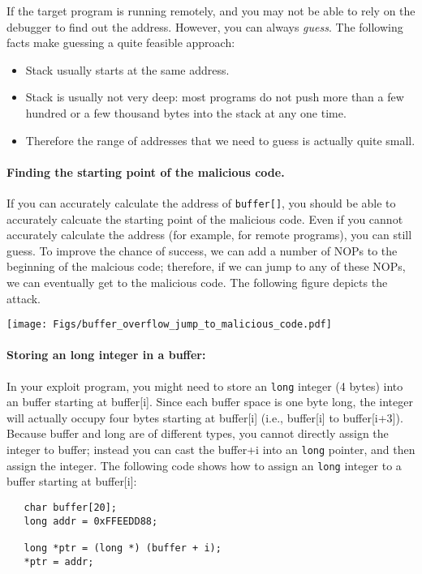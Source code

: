 If the target program is running remotely, and you may not be able to
rely on the debugger to find out the address. However, you can always
{\em guess}. The following facts make guessing a quite feasible approach:
      \begin{itemize}
      \item Stack usually starts at the same address.
      \item Stack is usually not very deep: most programs do not push more than
            a few hundred or a few thousand bytes into the stack at any one time.
      \item Therefore the range of addresses that we need to guess is actually
            quite small.
      \end{itemize}



\paragraph{Finding the starting point of the malicious code.}
If you can accurately calculate the address of {\tt buffer[]}, you should be 
able to accurately calcuate the starting point of the malicious code.
Even if you cannot accurately calculate the address (for example, for remote programs),
you can still guess. To improve the chance of success, we can add a
number of NOPs to the beginning of the malcious code; therefore, if we 
can jump to any of these NOPs, we can eventually get to the 
malicious code. The following figure depicts the attack.


\begin{center}
\texttt{[image: Figs/buffer\_overflow\_jump\_to\_malicious\_code.pdf]}
\end{center}


\paragraph{Storing an long integer in a buffer:} 
In your exploit program, you might need to store an {\tt long} 
integer (4 bytes) into an buffer starting at buffer[i]. 
Since each buffer space is one byte long,
the integer will actually occupy four bytes starting at buffer[i] (i.e.,
buffer[i] to buffer[i+3]). Because buffer and long are of different
types, you cannot directly assign the integer to buffer; instead you can 
cast the buffer+i into an {\tt long} pointer, and then assign the integer. The
following code shows how to assign an {\tt long} integer to a buffer
starting at buffer[i]:
\begin{verbatim}
   char buffer[20];
   long addr = 0xFFEEDD88;

   long *ptr = (long *) (buffer + i);
   *ptr = addr;
\end{verbatim}

